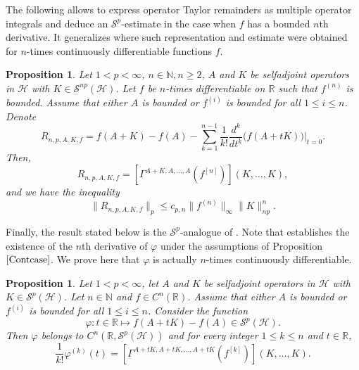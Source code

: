 \documentclass[12pt]{amsart}
\newtheorem{proposition}[theorem]{Proposition}
\theoremstyle{remark}
\renewcommand{\H}{\mbox{${\mathcal H}$}}
\newcommand{\N}{\mbox{${\mathbb N}$}}
\def\Sc{{\mathcal{S}}}
\begin{document}
The following allows to express operator Taylor remainders as multiple operator integrals and deduce an $\mathcal{S}^p$-estimate in the case when $f$ has a bounded $n$th derivative. It generalizes \cite[Theorem 3.8]{LMS} where such representation and estimate were obtained for $n$-times continuously differentiable functions $f$.


\begin{proposition}\label{Taylorrmd}
Let $1 < p < \infty$, $n \in\N, n\geq 2$, $A$ and $K$ be selfadjoint operators in $\mathcal{H}$ with $K\in \mathcal{S}^{np}(\mathcal{H})$. Let $f$ be $n$-times differentiable on $\mathbb{R}$ such that $f^{(n)}$ is bounded. Assume that either $A$ is bounded or $f^{(i)}$ is bounded for all $1\leq i \leq n$. Denote
$$
R_{n,p,A,K,f} = f(A+K)-f(A) - \sum_{k=1}^{n-1} \dfrac{1}{k!} \frac{d^k}{dt^k}\Big(f(A+tK)\Big)\Big|_{t=0}.
$$
Then,
\begin{equation}\label{Taylor}
R_{n,p,A,K,f} = \left[ \Gamma^{A+K, A, \ldots, A}(f^{[n]}) \right] (K, \ldots, K),
\end{equation}
and we have the inequality
\begin{equation}\label{Taylorineq}
\|R_{n,p,A,K,f}\|_p \leq c_{p,n} \|f^{(n)}\|_{\infty} \|K\|_{np}^n.
\end{equation}
\end{proposition}

Finally, the result stated below is the $\mathcal{S}^p$-analogue of \cite[Theorem 4.1]{CLSS}. Note that \cite[Theorem 3.7 (ii)]{LMS} establishes the existence of the $n$th derivative of $\varphi$ under the assumptions of Proposition $\ref{Contcase}$. We prove here that $\varphi$ is actually $n$-times continuously differentiable.

\begin{proposition}\label{Contcase}
Let $1 < p < \infty$, let $A$ and $K$ be selfadjoint operators in $\mathcal{H}$ with $K\in \mathcal{S}^p(\mathcal{H})$. Let $n \in\N$ and $f\in C^n(\mathbb{R})$.  Assume that either $A$ is bounded or $f^{(i)}$ is bounded for all $1\leq i\leq n$. Consider the function
$$\varphi : t\in \mathbb{R} \mapsto f(A+tK) - f(A) \in \mathcal{S}^p(\mathcal{H}).$$
Then $\varphi$ belongs to $C^n(\mathbb{R},\Sc^p(\H ))$ and for every integer $1 \leq k \leq n$ and $t\in \mathbb{R}$,
\begin{equation*}
\dfrac{1}{k!} \varphi^{(k)}(t) = \left[ \Gamma^{A+tK, A+tK, \ldots, A+tK}(f^{[k]}) \right] (K, \ldots, K).
\end{equation*}
\end{proposition}
\end{document}
